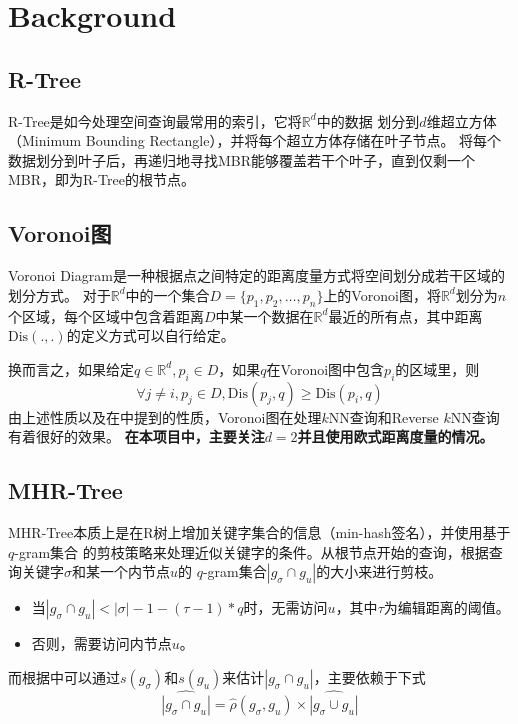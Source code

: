 \documentclass{ML}
\begin{document}
\section{Background}
\subsection{R-Tree}
R-Tree\cite{R-Tree}是如今处理空间查询最常用的索引，它将$\mathbb{R}^d$中的数据
划分到$d$维超立方体（Minimum Bounding Rectangle），并将每个超立方体存储在叶子节点。
将每个数据划分到叶子后，再递归地寻找MBR能够覆盖若干个叶子，直到仅剩一个MBR，即为R-Tree的根节点。

\subsection{Voronoi图}
Voronoi Diagram\cite{Voronoi-Diagram}是一种根据点之间特定的距离度量方式将空间划分成若干区域的划分方式。
对于$\mathbb{R}^d$中的一个集合$D = \{p_1, p_2, \dots, p_n\}$上的Voronoi图，将$\mathbb{R}^d$划分为$n$
个区域，每个区域中包含着距离$D$中某一个数据在$\mathbb{R}^d$最近的所有点，其中距离$\mathrm{Dis}(.,.)$的定义方式可以自行给定。

换而言之，如果给定$q \in \mathbb{R}^d, p_i \in D$，如果$q$在Voronoi图中包含$p_i$的区域里，则
$$\forall j \neq i, p_j \in D, \mathrm{Dis}(p_j, q) \ge \mathrm{Dis}(p_i, q)$$
由上述性质以及在\cite{VD-Property}中提到的性质，Voronoi图在处理$k$NN查询和Reverse $k$NN查询有着很好的效果。
\textbf{在本项目中，主要关注$d = 2$并且使用欧式距离度量的情况。}

\subsection{MHR-Tree}
MHR-Tree\cite{MHR-Tree}本质上是在R树上增加关键字集合的信息（min-hash签名），并使用基于$q$-gram集合
的剪枝策略来处理近似关键字的条件。从根节点开始的查询，根据查询关键字$\sigma$和某一个内节点$u$的
$q$-gram集合$|g_{\sigma} \cap g_u|$的大小来进行剪枝。
\begin{itemize}
    \item 当$|g_{\sigma} \cap g_u| < |\sigma| - 1 - (\tau - 1) * q$时，无需访问$u$，其中$\tau$为编辑距离的阈值。
    \item 否则，需要访问内节点$u$。
\end{itemize}
而根据\cite{MHR-Tree}中可以通过$s(g_{\sigma})$和$s(g_{u})$来估计$|g_{\sigma} \cap g_u|$，主要依赖于下式
$$ \widehat{|g_{\sigma} \cap g_u|} = \hat{\rho}(g_{\sigma}, g_u) \times \widehat{|g_{\sigma} \cup g_u|}$$
\end{document}

